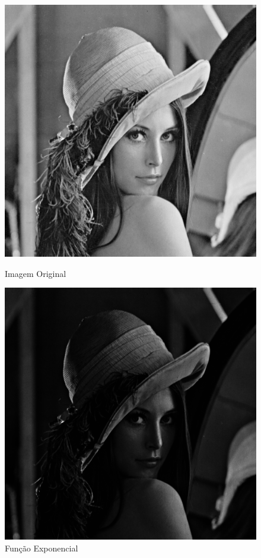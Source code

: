 \documentclass{article}
\begin{document}
\newpage
\begin{figure}[!htb]
\begin{minipage}[b]{0.45\linewidth}
\centering
\includegraphics[scale=0.32]{lena_B.png}
\caption{Imagem Original}
\label{fig:original}
\end{minipage}
\hspace{0.5cm}
\begin{minipage}[b]{0.45\linewidth}
\centering
\includegraphics[scale=0.32]{TransNLinearExp.png}
\caption{Função Exponencial}
\label{fig:rota}
\end{minipage}
\end{figure}
\end{document}

